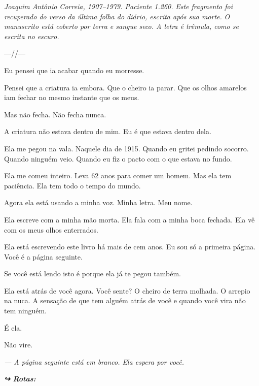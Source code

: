 
\noindent \textit{Joaquim Antônio Correia, 1907--1979. Paciente 1.260.}
\textit{Este fragmento foi recuperado do verso da última folha do diário, escrita após sua morte.}
\textit{O manuscrito está coberto por terra e sangue seco. A letra é trêmula, como se escrita no escuro.}

\noindent ---//---

\noindent Eu pensei que ia acabar quando eu morresse.

\noindent Pensei que a criatura ia embora. Que o cheiro ia parar. Que os olhos amarelos iam fechar no mesmo instante que os meus.

\noindent Mas não fecha. Não fecha nunca.

\noindent A criatura não estava dentro de mim. Eu é que estava dentro dela.

\noindent Ela me pegou na vala. Naquele dia de 1915. Quando eu gritei pedindo socorro. Quando ninguém veio. Quando eu fiz o pacto com o que estava no fundo.

\noindent Ela me comeu inteiro. Leva 62 anos para comer um homem. Mas ela tem paciência. Ela tem todo o tempo do mundo.

\noindent Agora ela está usando a minha voz. Minha letra. Meu nome.

\noindent Ela escreve com a minha mão morta. Ela fala com a minha boca fechada. Ela vê com os meus olhos enterrados.

\noindent Ela está escrevendo este livro há mais de cem anos. Eu sou só a primeira página. Você é a página seguinte.

\noindent Se você está lendo isto é porque ela já te pegou também.

\noindent Ela está atrás de você agora. Você sente? O cheiro de terra molhada. O arrepio na nuca. A sensação de que tem alguém atrás de você e quando você vira não tem ninguém.

\noindent É ela.

\noindent Não vire.

\noindent \textit{--- A página seguinte está em branco. Ela espera por você.}


\noindent\textit{\textbf{↪ Rotas:}  \rotasep {} \rotasep {} \rotasep {}}

